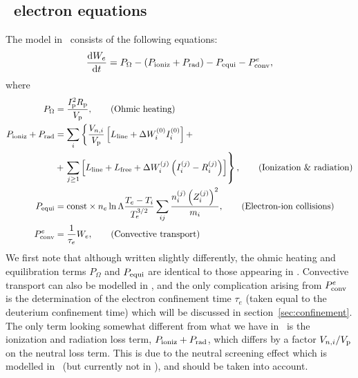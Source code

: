 \documentclass{notes}
\newcommand{\tDYON}{{\mdseries\DYON}}
\newcommand{\Ip}{I_{\rm p}}
\newcommand{\Rp}{R_{\rm p}}
\newcommand{\Vp}{V_{\rm p}}
\begin{document}
    \subsection{\tDYON\ electron equations}
    The model in \DYON\ consists of the following equations:
    \begin{equation}
        \frac{\mathrm{d} W_e}{\mathrm{d} t} = P_{\Omega} - \left(P_{\rm ioniz} + P_{\rm rad}\right)
        - P_{\rm equi} - P_{\rm conv}^e,
    \end{equation}
    where
    \begin{align}
        P_{\Omega} &= \frac{\Ip^2\Rp}{\Vp}, \tag{Ohmic heating}\\
        P_{\rm ioniz} + P_{\rm rad} &= \sum_i\left\{
            \frac{V_{n,i}}{\Vp}\left[ L_{\rm line} + \Delta W_i^{(0)} I_i^{(0)} \right]+\right.\nonumber\\
            &+ \left.
            \sum_{j\geq 1} \left[
                L_{\rm line} + L_{\rm free} + \Delta W_i^{(j)}\left( I_i^{(j)} - R_i^{(j)} \right)
            \right]
        \right\}, \tag{Ionization \& radiation}\\
        P_{\rm equi} &= \mathrm{const}\times n_e\ln\Lambda\frac{T_e-T_i}{T_e^{3/2}}\sum_{ij}
            \frac{n_i^{(j)}\left(Z_i^{(j)}\right)^2}{m_i}, \tag{Electron-ion collisions}\\
        P_{\rm conv}^e &= \frac{1}{\tau_e}W_e,\tag{Convective transport}
    \end{align}
    We first note that although written slightly differently, the ohmic heating
    and equilibration terms $P_\Omega$ and $P_{\rm equi}$ are identical to those
    appearing in \DREAM. Convective transport can also be modelled in \DREAM,
    and the only complication arising from $P_{\rm conv}^e$ is the determination
    of the electron confinement time $\tau_e$ (taken equal to the deuterium
    confinement time) which will be discussed in section~\ref{sec:confinement}.
    The only term looking somewhat different from what we have in \DREAM\ is the
    ionization and radiation loss term, $P_{\rm ioniz}+P_{\rm rad}$, which
    differs by a factor $V_{n,i}/\Vp$ on the neutral loss term. This is due to
    the neutral screening effect which is modelled in \DYON\ (but currently not
    in \DREAM), and should be taken into account.
\end{document}
